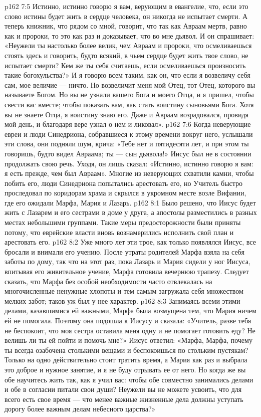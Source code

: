 \vs p162 7:5 Истинно, истинно говорю я вам, верующим в евангелие, что, если это слово истины будет жить в сердце человека, он никогда не испытает смерти. А теперь книжник, что рядом со мной, говорит, что так как Авраам мертв, равно как и пророки, то это как раз и доказывает, что во мне дьявол. И он спрашивает: «Неужели ты настолько более велик, чем Авраам и пророки, что осмеливаешься стоять здесь и говорить, будто всякий, в чьем сердце будет жить твое слово, не испытает смерти? Кем же ты себя считаешь, если осмеливаешься произносить такие богохульства?» И я говорю всем таким, как он, что если я возвеличу себя сам, мое величие --- ничто. Но возвеличит меня мой Отец, тот Отец, которого вы называете Богом. Но вы не узнали вашего Бога и моего Отца, и я пришел, чтобы свести вас вместе; чтобы показать вам, как стать воистину сыновьями Бога. Хотя вы не знаете Отца, я воистину знаю его. Даже и Авраам возрадовался, провидя мой день, и благодаря вере узнал о нем и ликовал».
\vs p162 7:6 \pc Когда неверующие евреи и люди Синедриона, собравшиеся к этому времени вокруг него, услышали эти слова, они подняли шум, крича: «Тебе нет и пятидесяти лет, и при этом ты говоришь, будто видел Авраама; ты --- сын дьявола!» Иисус был не в состоянии продолжать свою речь. Уходя, он лишь сказал: «Истинно, истинно говорю я вам: я есть прежде, чем был Авраам». Многие из неверующих схватили камни, чтобы побить его, люди Синедриона попытались арестовать его, но Учитель быстро проследовал по коридорам храма и скрылся в укромном месте возле Вифании, где его ожидали Марфа, Мария и Лазарь.
\vs p162 8:1 Было решено, что Иисус будет жить с Лазарем и его сестрами в доме у друга, а апостолы разместились в разных местах небольшими группами. Такие меры предосторожности были приняты потому, что еврейские власти вновь вознамерились исполнить свой план и арестовать его.
\vs p162 8:2 Уже много лет эти трое, как только появлялся Иисус, все бросали и внимали его учению. После утраты родителей Марфа взяла на себя заботы по дому, так что на этот раз, пока Лазарь и Мария сидели у ног Иисуса, впитывая его живительное учение, Марфа готовила вечернюю трапезу. Следует сказать, что Марфа без особой необходимости часто отвлекалась на многочисленные ненужные хлопоты и тем самым загружала себя множеством мелких забот; таков уж был у нее характер.
\vs p162 8:3 Занимаясь всеми этими делами, казавшимися ей важными, Марфа была возмущена тем, что Мария ничем ей не помогала. Поэтому она подошла к Иисусу и сказала: «Учитель, разве тебя не беспокоит, что моя сестра оставила меня одну и не помогает готовить еду? Не велишь ли ты ей пойти и помочь мне?» Иисус ответил: «Марфа, Марфа, почему ты всегда озабочена столькими вещами и беспокоишься по стольким пустякам? Только на одно действительно стоит тратить время, а Мария как раз и выбрала это доброе и нужное занятие, и я не буду отрывать ее от него. Но когда же вы обе научитесь жить так, как я учил вас: чтобы обе совместно занимались делами и обе в согласии питали свои души? Неужели вы не можете усвоить, что для всего есть свое время --- что менее важные жизненные дела должны уступать дорогу более важным делам небесного царства?»
